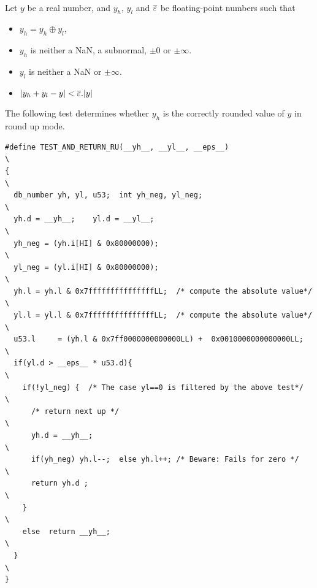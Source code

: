\begin{theorem}
\label{th:roundingDirected}
~\\
Let $y$ be a real number, and $y_h$, $y_l$ and ${\overline{\varepsilon}}$ be
floating-point numbers such that
  \begin{itemize}
  \item $y_h=y_h\oplus y_l$,
  \item $y_h$ is neither a NaN, a subnormal, $\pm 0$ or $\pm \infty$.
  \item $y_l$ is neither a NaN or $\pm \infty$.
  \item $|y_h+y_l - y| <{\overline{\varepsilon}}.|y|$
\end{itemize}

The following test determines whether $y_h$ is the
  correctly rounded value of $y$ in round up mode.

\begin{lstlisting}[caption={Test for directed rounding},
  firstnumber=1]
#define TEST_AND_RETURN_RU(__yh__, __yl__, __eps__)                    \
{                                                                      \
  db_number yh, yl, u53;  int yh_neg, yl_neg;                          \
  yh.d = __yh__;    yl.d = __yl__;                                     \
  yh_neg = (yh.i[HI] & 0x80000000);                                    \
  yl_neg = (yl.i[HI] & 0x80000000);                                    \
  yh.l = yh.l & 0x7fffffffffffffffLL;  /* compute the absolute value*/ \
  yl.l = yl.l & 0x7fffffffffffffffLL;  /* compute the absolute value*/ \
  u53.l     = (yh.l & 0x7ff0000000000000LL) +  0x0010000000000000LL;   \
  if(yl.d > __eps__ * u53.d){                                          \
    if(!yl_neg) {  /* The case yl==0 is filtered by the above test*/   \
      /* return next up */                                             \
      yh.d = __yh__;                                                   \
      if(yh_neg) yh.l--;  else yh.l++; /* Beware: Fails for zero */    \
      return yh.d ;                                                    \
    }                                                                  \
    else  return __yh__;                                               \
  }                                                                    \
}
\end{lstlisting}
\end{theorem}

